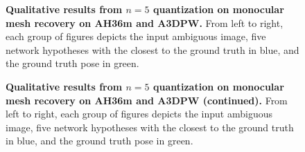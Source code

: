 \begin{figure}[t]
\def\topbtm{5cm}
\centering

\caption{%
    \textbf{Qualitative results from $n=5$ quantization on monocular mesh recovery on AH36m and A3DPW.} 
    From left to right, each group of figures depicts the input ambiguous image, five network hypotheses with the closest to the ground truth in blue, and the ground truth pose in green.
    }\label{fig:qual_results_all}
\end{figure}


\begin{figure}[t]
\centering
\caption{%
    \textbf{Qualitative results from $n=5$ quantization on monocular mesh recovery on AH36m and A3DPW (continued).} 
    From left to right, each group of figures depicts the input ambiguous image, five network hypotheses with the closest to the ground truth in blue, and the ground truth pose in green.
    }\label{fig:qual_results_all2}
\end{figure}